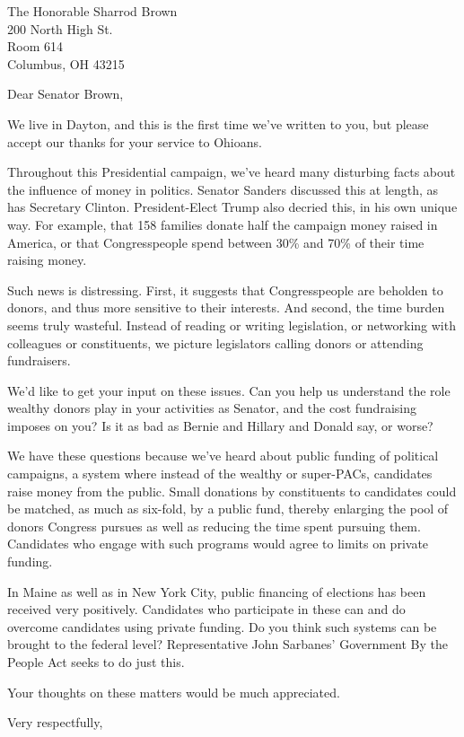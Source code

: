 \documentclass{letter}
\begin{document}
\begin{letter}{
  The Honorable Sharrod Brown \\
  200 North High St. \\
  Room 614 \\
  Columbus, OH 43215}

\opening{Dear Senator Brown,}

We live in Dayton, and this is the first time we've written to you, but please accept our thanks for your service to Ohioans.

Throughout this Presidential campaign, we've heard many disturbing facts about the influence of money in politics. Senator Sanders discussed this at length, as has Secretary Clinton. President-Elect Trump also decried this, in his own unique way. For example, that 158 families donate half the campaign money raised in America, or that Congresspeople spend between 30\% and 70\% of their time raising money.

Such news is distressing. First, it suggests that Congresspeople are beholden to donors, and thus more sensitive to their interests. And second, the time burden seems truly wasteful. Instead of reading or writing legislation, or networking with colleagues or constituents, we picture legislators calling donors or attending fundraisers.

We'd like to get your input on these issues. Can you help us understand the role wealthy donors play in your activities as Senator, and the cost fundraising imposes on you? Is it as bad as Bernie and Hillary and Donald say, or worse?

We have these questions because we've heard about public funding of political campaigns, a system where instead of the wealthy or super-PACs, candidates raise money from the public. Small donations by constituents to candidates could be matched, as much as six-fold, by a public fund, thereby enlarging the pool of donors Congress pursues as well as reducing the time spent pursuing them. Candidates who engage with such programs would agree to limits on private funding.

In Maine as well as in New York City, public financing of elections has been received very positively. Candidates who participate in these can and do overcome candidates using private funding. Do you think such systems can be brought to the federal level? Representative John Sarbanes' Government By the People Act seeks to do just this.

Your thoughts on these matters would be much appreciated.

\closing{Very respectfully,}


\end{letter}
\end{document}
